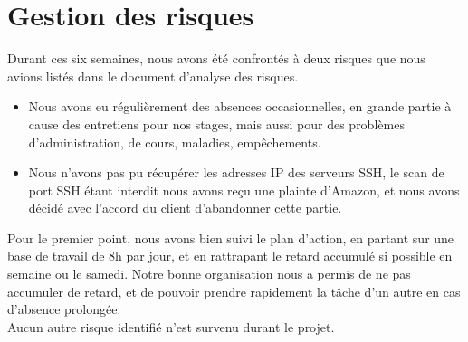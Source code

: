 \section{Gestion des risques}

Durant ces six semaines, nous avons été confrontés à deux risques que nous avions listés dans le document d'analyse des risques.
\begin{itemize}
\item Nous avons eu régulièrement des absences occasionnelles, en grande partie à cause des entretiens pour nos stages, mais aussi pour des problèmes d'administration, de cours, maladies, empêchements.
\item Nous n'avons pas pu récupérer les adresses IP des serveurs SSH, le scan de port SSH étant interdit nous avons reçu une plainte d'Amazon, et nous avons décidé avec l'accord du client d'abandonner cette partie.\\
\end{itemize}

Pour le premier point, nous avons bien suivi le plan d'action, en partant sur une base de travail de 8h par jour, et en rattrapant le retard accumulé si possible en semaine ou le samedi. Notre bonne organisation nous a permis de ne pas accumuler de retard, et de pouvoir prendre rapidement la tâche d'un autre en cas d'absence prolongée.\\

Aucun autre risque identifié n'est survenu durant le projet.

